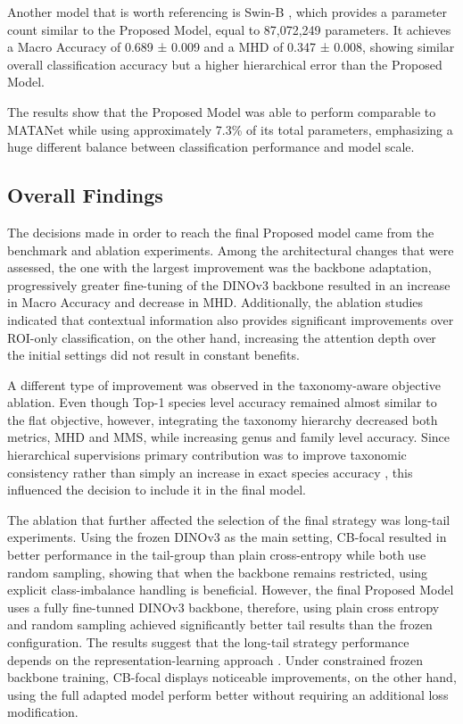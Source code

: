 \documentclass[preprint,12pt]{elsarticle}
\begin{document}
Another model that is worth referencing is Swin-B
\citep{ref38}, which provides a parameter count
similar to the Proposed Model, equal to 87,072,249 parameters. It
achieves a Macro Accuracy of 0.689 ± 0.009 and a MHD of 0.347 ± 0.008,
showing similar overall classification accuracy but a higher
hierarchical error than the Proposed Model.

The results show that the Proposed Model was able to perform comparable
to MATANet while using approximately 7.3\% of its total parameters,
emphasizing a huge different balance between classification performance
and model scale.

\subsection{Overall Findings}\label{overall-findings}

The decisions made in order to reach the final Proposed model came from
the benchmark and ablation experiments. Among the architectural changes
that were assessed, the one with the largest improvement was the
backbone adaptation, progressively greater fine-tuning of the DINOv3
backbone resulted in an increase in Macro Accuracy and decrease in MHD.
Additionally, the ablation studies indicated that contextual information
also provides significant improvements over ROI-only classification, on
the other hand, increasing the attention depth over the initial settings
did not result in constant benefits.

A different type of improvement was observed in the taxonomy-aware
objective ablation. Even though Top-1 species level accuracy remained
almost similar to the flat objective, however, integrating the taxonomy
hierarchy decreased both metrics, MHD and MMS, while increasing genus
and family level accuracy. Since hierarchical
supervision\textquotesingle s primary contribution was to improve
taxonomic consistency rather than simply an increase in exact species
accuracy \citep{ref24}, this influenced the
decision to include it in the final model.

The ablation that further affected the selection of the final strategy
was long-tail experiments. Using the frozen DINOv3 as the main setting,
CB-focal \citep{ref14,ref63} resulted in better performance in
the tail-group than plain cross-entropy while both use random sampling,
showing that when the backbone remains restricted, using explicit
class-imbalance handling is beneficial. However, the final Proposed
Model uses a fully fine-tunned DINOv3 backbone, therefore, using plain
cross entropy and random sampling achieved significantly better tail
results than the frozen configuration. The results suggest that the
long-tail strategy performance depends on the representation-learning
approach \citep{ref10,ref65}. Under constrained frozen backbone
training, CB-focal displays noticeable improvements, on the other hand,
using the full adapted model perform better without requiring an
additional loss modification.
\end{document}
